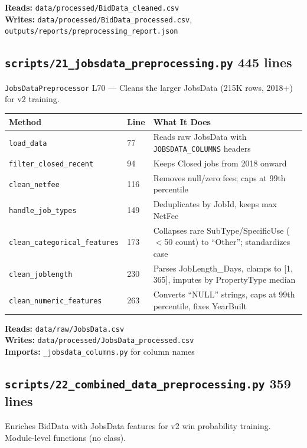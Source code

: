 \documentclass[11pt,a4paper]{article}
\newcommand{\file}[1]{\texttt{\color{gssblue!70!black}#1}}
\newcommand{\func}[1]{\texttt{\color{gssgreen!80!black}#1}}
\newcommand{\cls}[1]{\texttt{\color{uipurple}#1}}
\newcommand{\lineref}[1]{\textcolor{gssgray}{\small L#1}}
\newcommand{\pipetag}[1]{\colorbox{pipeblue!15}{\small\textcolor{pipeblue}{\textbf{#1}}}}
\begin{document}
\textbf{Reads:} \file{data/processed/BidData\_cleaned.csv}\\
\textbf{Writes:} \file{data/processed/BidData\_processed.csv}, \file{outputs/reports/preprocessing\_report.json}

\subsection{\file{scripts/21\_jobsdata\_preprocessing.py} \pipetag{445 lines}}

\cls{JobsDataPreprocessor} \lineref{70} --- Cleans the larger JobsData (215K rows,
2018+) for v2 training.

\begin{longtable}{l l p{8cm}}
\toprule
\textbf{Method} & \textbf{Line} & \textbf{What It Does} \\
\midrule
\endhead
\func{load\_data} & 77 & Reads raw JobsData with \texttt{JOBSDATA\_COLUMNS} headers \\
\func{filter\_closed\_recent} & 94 & Keeps Closed jobs from 2018 onward \\
\func{clean\_netfee} & 116 & Removes null/zero fees; caps at 99th percentile \\
\func{handle\_job\_types} & 149 & Deduplicates by JobId, keeps max NetFee \\
\func{clean\_categorical\_features} & 173 & Collapses rare SubType/SpecificUse ($<$50 count) to ``Other''; standardizes case \\
\func{clean\_joblength} & 230 & Parses JobLength\_Days, clamps to [1,\,365], imputes by PropertyType median \\
\func{clean\_numeric\_features} & 263 & Converts ``NULL'' strings, caps at 99th percentile, fixes YearBuilt \\
\bottomrule
\end{longtable}

\textbf{Reads:} \file{data/raw/JobsData.csv}\\
\textbf{Writes:} \file{data/processed/JobsData\_processed.csv}\\
\textbf{Imports:} \file{\_jobsdata\_columns.py} for column names

\subsection{\file{scripts/22\_combined\_data\_preprocessing.py} \pipetag{359 lines}}

Enriches BidData with JobsData features for v2 win probability training.
Module-level functions (no class).
\end{document}
